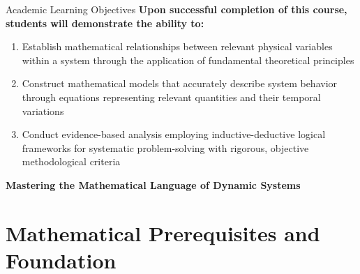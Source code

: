 \documentclass[10pt,aspectratio=169]{beamer}
\newcommand{\concept}[1]{\textbf{#1}}
\begin{document}
\begin{frame}{Academic Learning Objectives}
    \concept{Upon successful completion of this course, students will demonstrate the ability to:}
    
    \vspace{0.4cm}
    
    \begin{enumerate}
        \item Establish mathematical relationships between relevant physical variables within a system through the application of fundamental theoretical principles
        
        \vspace{0.3cm}
        
        \item Construct mathematical models that accurately describe system behavior through equations representing relevant quantities and their temporal variations
        
        \vspace{0.3cm}
        
        \item Conduct evidence-based analysis employing inductive-deductive logical frameworks for systematic problem-solving with rigorous, objective methodological criteria
    \end{enumerate}
    
    \vspace{0.4cm}
    
    \begin{center}
        \large\textbf{Mastering the Mathematical Language of Dynamic Systems}
    \end{center}
\end{frame}

\section{Mathematical Prerequisites and Foundation}
\end{document}
